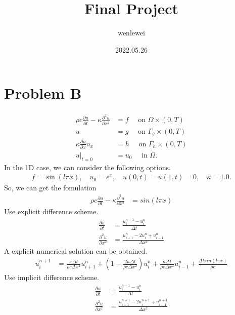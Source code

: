 \documentclass[a4paper]{article}
\title{Final Project}
\author{\songti wenlewei}
\date{2022.05.26}
\begin{document}
\maketitle
    \section{Problem B}
        \begin{align*}
            \rho c \frac{\partial u}{\partial t} - \kappa  \frac{\partial^2 u}{\partial x^2} &= f \quad \mbox{ on } \Omega \times (0,T) \\
            u &= g \quad \mbox{ on } \Gamma_{g} \times (0,T) \\
            \kappa \frac{\partial u}{\partial x} n_{x}  &= h \quad \mbox{ on } \Gamma_h \times (0,T) \\
            u|_{t=0} &= u_0 \quad \mbox{ in } \Omega.
        \end{align*}
        In the 1D case, we can consider the following options.
        \begin{align*}
            f = \sin(l \pi x), \quad u_0 = e^{x}, \quad u(0,t) = u(1,t) = 0, \quad \kappa = 1.0. 
        \end{align*}
        So, we can get the fomulation
        \begin{align*}
            \rho c \frac{\partial u}{\partial t} - \kappa  \frac{\partial^2 u}{\partial x^2} &= sin(l\pi x)
        \end{align*}
        Use explicit difference scheme.
        \begin{align*}
            \frac{\partial u}{\partial t} &= \frac{u^{n+1}_i - u^n_i}{\Delta t} \\
            \frac{\partial^2 u}{\partial x^2} &= \frac{u^n_{i+1}-2u^n_i+u^n_{i-1}}{\Delta x^2}
        \end{align*}
        A explicit numerical solution can be obtained.
        \begin{align*}
            u^{n+1}_i &= \frac{\kappa \Delta t}{\rho c \Delta x^2} u^n_{i+1} + (1 - \frac{2\kappa \Delta t}{\rho c \Delta x^2})u^n_i + \frac{\kappa \Delta t}{\rho c \Delta x^2}u^n_{i-1} + \frac{\Delta t sin(l \pi x)}{\rho c}
        \end{align*}
        Use implicit difference scheme.
        \begin{align*}
            \frac{\partial u}{\partial t} &= \frac{u^{n+1}_i - u^n_i}{\Delta t} \\
            \frac{\partial^2 u}{\partial x^2} &= \frac{u^{n+1}_{i+1}-2u^{n+1}_i+u^{n+1}_{i-1}}{\Delta x^2}
        \end{align*}
\end{document}
